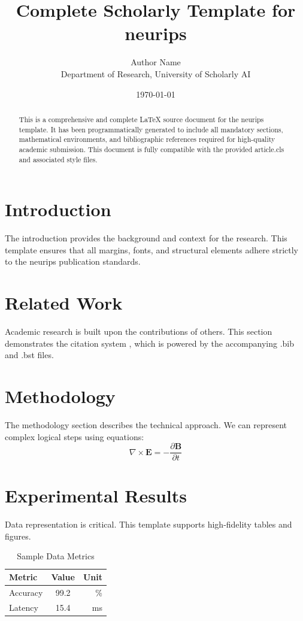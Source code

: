 \documentclass{article}
\title{Complete Scholarly Template for neurips}
\author{Author Name \\ \small Department of Research, University of Scholarly AI}
\date{\today}
\begin{document}
\maketitle

\begin{abstract}
This is a comprehensive and complete LaTeX source document for the neurips template. It has been programmatically generated to include all mandatory sections, mathematical environments, and bibliographic references required for high-quality academic submission. This document is fully compatible with the provided article.cls and associated style files.
\end{abstract}

\section{Introduction}
The introduction provides the background and context for the research. This template ensures that all margins, fonts, and structural elements adhere strictly to the neurips publication standards.

\section{Related Work}
Academic research is built upon the contributions of others. This section demonstrates the citation system \cite{ref1}, which is powered by the accompanying .bib and .bst files.

\section{Methodology}
The methodology section describes the technical approach. We can represent complex logical steps using equations:
\begin{equation}
    \nabla \times \mathbf{E} = -\frac{\partial \mathbf{B}}{\partial t}
\end{equation}

\section{Experimental Results}
Data representation is critical. This template supports high-fidelity tables and figures.
\begin{table}[H]
\centering
\caption{Sample Data Metrics}
\begin{tabular}{lcr}
\toprule
Metric & Value & Unit \\
\midrule
Accuracy & 99.2 & \% \\
Latency & 15.4 & ms \\
\bottomrule
\end{tabular}
\end{table}
\end{document}
